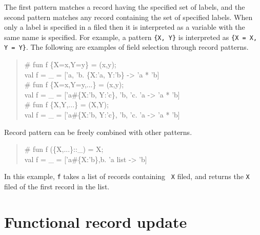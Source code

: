 \documentclass{jbook}
\newcommand{\txt}[2]{#2}
\begin{document}
	The first pattern matches a record having the specified set of
labels, and the second pattern matches any record containing the set of
specified labels.
	When only a label is specified in a filed then it
is interpreted as a variable with the same name is specified.
	For example, a pattern {\tt \{X, Y\}} is interpreted as 
{\tt \{X = X, Y = Y\}}.
	The following are examples of field selection through record patterns.
\begin{tt}\begin{quote}
\# fun f \{X=x,Y=y\} = (x,y);\\
val f = \_ = ['a, 'b. \{X:'a, Y:'b\} -> 'a * 'b]\\
\# fun f \{X=x,Y=y,...\} = (x,y);\\
val f = \_ = ['a\#\{X:'b, Y:'c\}, 'b, 'c. 'a -> 'a * 'b]\\
\# fun f \{X,Y,...\} = (X,Y);\\
val f = \_ = ['a\#\{X:'b, Y:'c\}, 'b, 'c. 'a -> 'a * 'b]
\end{quote}\end{tt}
	Record pattern can be freely combined with other patterns.
\begin{tt}\begin{quote}
\# fun f (\{X,...\}::\_) = X;\\
val f = \_ = ['a\#\{X:'b\},b. 'a list -> 'b]\\
\end{quote}\end{tt}
	In this example, {\tt f} takes a list of records containing {\tt
X} filed, and returns the {\tt X} filed of the first record in the list.
\fi%

\section{\txt{フィールドの変更}{Functional record update}}
\label{sec:extensionFieldupdate}
\end{document}
